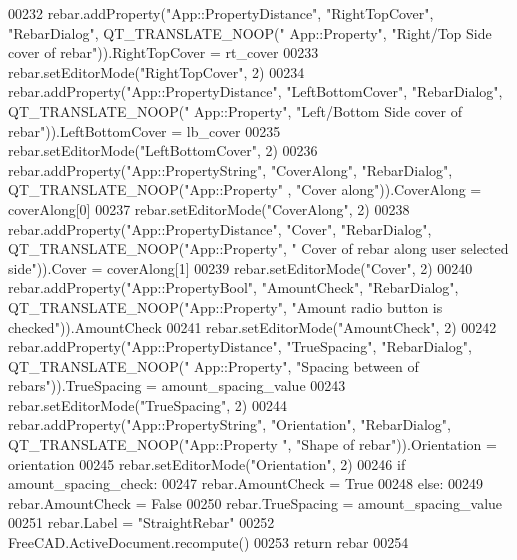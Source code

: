 \begin{DoxyCode}
00232     rebar.addProperty(\textcolor{stringliteral}{"App::PropertyDistance"}, \textcolor{stringliteral}{"RightTopCover"}, \textcolor{stringliteral}{"RebarDialog"}, QT\_TRANSLATE\_NOOP(\textcolor{stringliteral}{"
      App::Property"}, \textcolor{stringliteral}{"Right/Top Side cover of rebar"})).RightTopCover = rt\_cover
00233     rebar.setEditorMode(\textcolor{stringliteral}{"RightTopCover"}, 2)
00234     rebar.addProperty(\textcolor{stringliteral}{"App::PropertyDistance"}, \textcolor{stringliteral}{"LeftBottomCover"}, \textcolor{stringliteral}{"RebarDialog"}, QT\_TRANSLATE\_NOOP(\textcolor{stringliteral}{"
      App::Property"}, \textcolor{stringliteral}{"Left/Bottom Side cover of rebar"})).LeftBottomCover = lb\_cover
00235     rebar.setEditorMode(\textcolor{stringliteral}{"LeftBottomCover"}, 2)
00236     rebar.addProperty(\textcolor{stringliteral}{"App::PropertyString"}, \textcolor{stringliteral}{"CoverAlong"}, \textcolor{stringliteral}{"RebarDialog"}, QT\_TRANSLATE\_NOOP(\textcolor{stringliteral}{"App::Property"}
      , \textcolor{stringliteral}{"Cover along"})).CoverAlong = coverAlong[0]
00237     rebar.setEditorMode(\textcolor{stringliteral}{"CoverAlong"}, 2)
00238     rebar.addProperty(\textcolor{stringliteral}{"App::PropertyDistance"}, \textcolor{stringliteral}{"Cover"}, \textcolor{stringliteral}{"RebarDialog"}, QT\_TRANSLATE\_NOOP(\textcolor{stringliteral}{"App::Property"}, \textcolor{stringliteral}{"
      Cover of rebar along user selected side"})).Cover = coverAlong[1]
00239     rebar.setEditorMode(\textcolor{stringliteral}{"Cover"}, 2)
00240     rebar.addProperty(\textcolor{stringliteral}{"App::PropertyBool"}, \textcolor{stringliteral}{"AmountCheck"}, \textcolor{stringliteral}{"RebarDialog"}, QT\_TRANSLATE\_NOOP(\textcolor{stringliteral}{"App::Property"},
       \textcolor{stringliteral}{"Amount radio button is checked"})).AmountCheck
00241     rebar.setEditorMode(\textcolor{stringliteral}{"AmountCheck"}, 2)
00242     rebar.addProperty(\textcolor{stringliteral}{"App::PropertyDistance"}, \textcolor{stringliteral}{"TrueSpacing"}, \textcolor{stringliteral}{"RebarDialog"}, QT\_TRANSLATE\_NOOP(\textcolor{stringliteral}{"
      App::Property"}, \textcolor{stringliteral}{"Spacing between of rebars"})).TrueSpacing = amount\_spacing\_value
00243     rebar.setEditorMode(\textcolor{stringliteral}{"TrueSpacing"}, 2)
00244     rebar.addProperty(\textcolor{stringliteral}{"App::PropertyString"}, \textcolor{stringliteral}{"Orientation"}, \textcolor{stringliteral}{"RebarDialog"}, QT\_TRANSLATE\_NOOP(\textcolor{stringliteral}{"App::Property
      "}, \textcolor{stringliteral}{"Shape of rebar"})).Orientation = orientation
00245     rebar.setEditorMode(\textcolor{stringliteral}{"Orientation"}, 2)
00246     \textcolor{keywordflow}{if} amount\_spacing\_check:
00247         rebar.AmountCheck = \textcolor{keyword}{True}
00248     \textcolor{keywordflow}{else}:
00249         rebar.AmountCheck = \textcolor{keyword}{False}
00250         rebar.TrueSpacing = amount\_spacing\_value
00251     rebar.Label = \textcolor{stringliteral}{"StraightRebar"}
00252     FreeCAD.ActiveDocument.recompute()
00253     \textcolor{keywordflow}{return} rebar
00254 
\end{DoxyCode}


